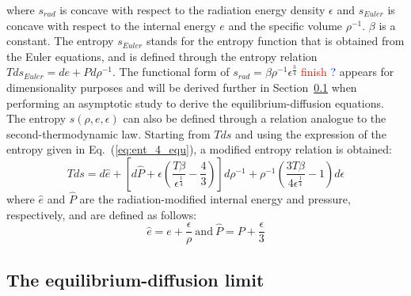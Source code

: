\documentclass[review]{elsarticle}
\newcommand{\eqt}[1]{Eq.~(\ref{#1})}                     %
\newcommand{\sect}[1]{Section~\ref{#1}}                     %
\newcommand{\tcr}[1]{\textcolor{red}{#1}}
\newcommand{\tcb}[1]{\textcolor{blue}{#1}}
\begin{document}
where $s_{rad}$ is concave with respect to the radiation energy density $\epsilon$ and $s_{Euler}$ is concave with respect to the internal energy $e$ and the specific volume $\rho^{-1}$. $\beta$ is a constant. The entropy $s_{Euler}$ stands for the entropy function that is obtained from the Euler equations, and is defined through the entropy relation $Tds_{Euler} = de + P d \rho^{-1}$. The functional form of $s_{rad} = \beta \rho^{-1} \epsilon^\frac{3}{4}$ \tcr{finish} \tcb{?} appears for dimensionality purposes and will be derived further in \sect{sect:equ-diff} when performing an asymptotic study to derive the equilibrium-diffusion equations. 
The entropy $s(\rho,e,\epsilon)$ can also be defined through a relation analogue to the second-thermodynamic law. Starting from $Tds$ and using the expression of the entropy given in \eqt{eq:ent_4_equ}, a modified entropy relation is obtained:
%
\begin{equation}\label{eq:ent_relation}
Tds = d\hat{e} + \left[ d\hat{P} + \epsilon \left( \frac{T \beta}{\epsilon^\frac{1}{4}} -\frac{4}{3} \right) \right] d \rho^{-1} + \rho^{-1}\left( \frac{3 T \beta}{4 \epsilon^\frac{1}{4}} -1 \right) d \epsilon
\end{equation}
%
where $\hat{e}$ and $\hat{P}$ are the radiation-modified internal energy and pressure, respectively, and are defined as follows:
%
\begin{equation}\label{eq:rad_mod_var}
\hat{e} = e + \frac{\epsilon}{\rho} \ \text{and} \ \hat{P} = P + \frac{\epsilon}{3}
\end{equation}
%
\subsection{The equilibrium-diffusion limit}\label{sect:equ-diff}
\end{document}
